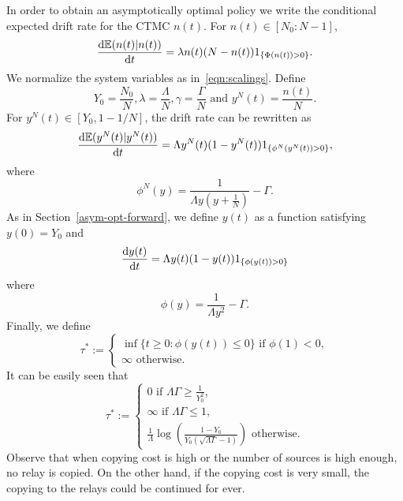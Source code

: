\documentclass[10pt,journal,letterpaper]{IEEEtran}
\begin{document}
{In order to obtain an asymptotically optimal policy we write the conditional expected drift rate for the CTMC $n(t)$.
For $n(t) \in [N_0:N-1]$,
\begin{equation*}
\frac{{\rm d}\mathbb{E}(n(t)|n(t))}{{\rm d}t} = \lambda n(t)(N-n(t))1_{\{\Phi(n(t)) > 0\}}.
\end{equation*}
We normalize the system variables as in~\eqref{eqn:scalings}. Define
\begin{equation}
\label{eqn:scalings-sd}
Y_0 = \frac{N_0}{N}, \lambda = \frac{\Lambda}{N}, \gamma = \frac{\Gamma}{N} \mbox{ and }y^N(t) = \frac{n(t)}{N}.
\end{equation}
For $y^N(t) \in [Y_0,1-1/N]$, the drift rate can be rewritten as
\begin{equation*}
\frac{{\rm d}\mathbb{E}(y^N(t)|y^N(t))}{{\rm d}t} = \Lambda y^N(t)(1-y^N(t))1_{\{\phi^N(y^N(t)) > 0\}},
\end{equation*}
where
\[
\phi^N(y) = \frac{1}{\Lambda y(y+\frac{1}{N})} - \Gamma.
\]
As in Section~\ref{asym-opt-forward}, we define $y(t)$ as a function satisfying $y(0) = Y_0$ and
\begin{equation*}
\frac{{\rm d}y(t)}{{\rm d}t} = \Lambda y(t)(1-y(t))1_{\{\phi(y(t)) > 0\}}
\end{equation*}
where
\begin{equation*}
\phi(y) = \frac{1}{\Lambda y^2} - \Gamma.
\end{equation*}
Finally, we define
\begin{equation*}
\tau^{\ast} := \begin{cases}
                   \inf\{t \geq 0: \phi(y(t)) \leq 0\} \mbox{ if } \phi(1) < 0,\\
                   \infty \mbox{ otherwise.} \end{cases}
\end{equation*}
It can be easily seen that
\begin{equation}
\label{eqn:stop-relays-sd} \tau^{\ast} :=
\begin{cases}
                  0  \mbox{ if } \Lambda \Gamma \geq \frac{1}{Y_0^2}, \\
                  \infty \mbox{ if } \Lambda \Gamma \leq 1, \\
                 \frac{1}{\Lambda} \log\left(\frac{1 - Y_0}{Y_0(\sqrt{\Lambda \Gamma} -1)}\right) \mbox{ otherwise.}\end{cases}
\end{equation}
Observe that when copying cost is high or the number of sources is high enough, no relay is copied. On the other hand,
if the copying cost is very small, the copying to the relays could be continued for ever.

}
\end{document}
